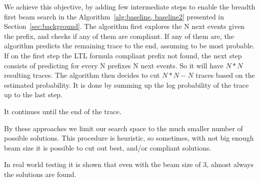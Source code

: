 We achieve this objective, by adding few intermediate steps to enable the breadth first beam search in the Algorithm~\ref{alg:baseline, baseline2} presented in Section~\ref{sec:background}.%
%
The algorithm first explores the N next events given the prefix, and checks if any of them are compliant. If any of them are, the algorithm predicts the remaining trace to the end, assuming to be most probable. If on the first step the LTL formula compliant prefix not found, the next step consists of predicting for every N prefixes N next events. So it will have $N*N$ resulting traces. The algorithm then decides to cut $N*N-N$ traces based on the estimated probability. It is done by summing up the log probability of the trace up to the last step.

It continues until the end of the trace.

By these approaches we limit our search space to the much smaller number of possible solutions. This procedure is heuristic, so sometimes, with not big enough beam size it is possible to cut out best, and/or compliant solutions.

In real world testing it is shown that even with the beam size of 3, almost always the solutions are found.











